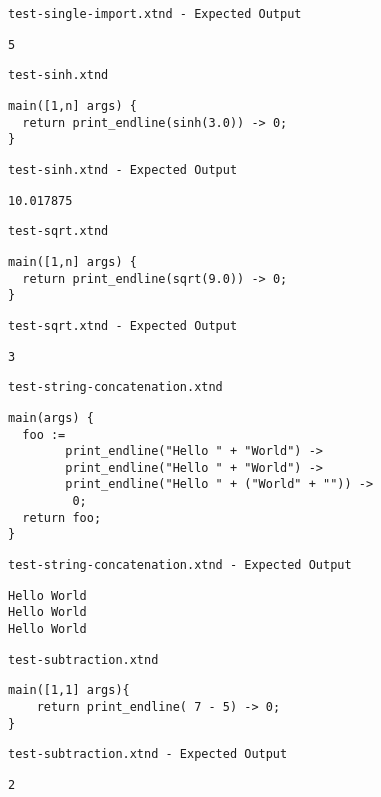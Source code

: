 \medskip \noindent \texttt{test-single-import.xtnd - Expected Output}


\begin{lstlisting}
5
\end{lstlisting}


\medskip \noindent \texttt{test-sinh.xtnd}


\begin{lstlisting}
main([1,n] args) {
  return print_endline(sinh(3.0)) -> 0;
}
\end{lstlisting}


\medskip \noindent \texttt{test-sinh.xtnd - Expected Output}


\begin{lstlisting}
10.017875
\end{lstlisting}


\medskip \noindent \texttt{test-sqrt.xtnd}


\begin{lstlisting}
main([1,n] args) {
  return print_endline(sqrt(9.0)) -> 0;
}
\end{lstlisting}


\medskip \noindent \texttt{test-sqrt.xtnd - Expected Output}


\begin{lstlisting}
3
\end{lstlisting}


\medskip \noindent \texttt{test-string-concatenation.xtnd}


\begin{lstlisting}
main(args) {
  foo :=
		print_endline("Hello " + "World") ->
		print_endline("Hello " + "World") ->
		print_endline("Hello " + ("World" + "")) ->
		 0;
  return foo;
}
\end{lstlisting}


\medskip \noindent \texttt{test-string-concatenation.xtnd - Expected Output}


\begin{lstlisting}
Hello World
Hello World
Hello World
\end{lstlisting}


\medskip \noindent \texttt{test-subtraction.xtnd}


\begin{lstlisting}
main([1,1] args){
	return print_endline( 7 - 5) -> 0;
}
\end{lstlisting}


\medskip \noindent \texttt{test-subtraction.xtnd - Expected Output}


\begin{lstlisting}
2
\end{lstlisting}


